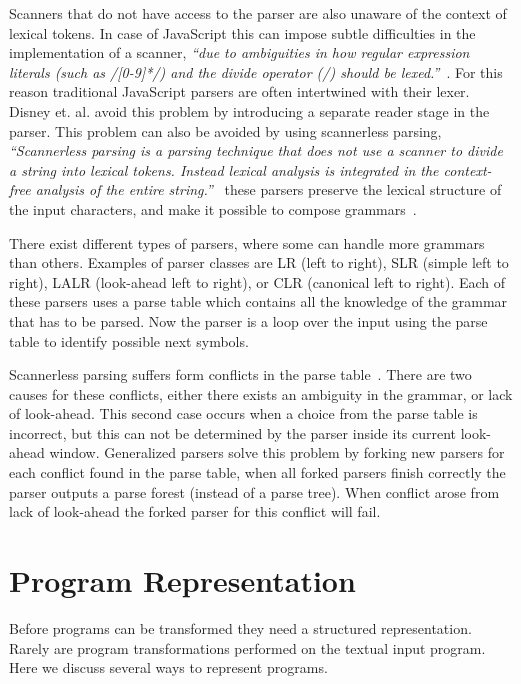 Scanners that do not have access to the parser are also unaware of the context of lexical tokens. In case of JavaScript this can impose subtle difficulties in the implementation of a scanner, \textit{``due to ambiguities in how regular expression literals (such as /[0-9]*/) and the divide operator (/) should be lexed.''}~\cite{Disney2014}. For this reason traditional JavaScript parsers are often intertwined with their lexer. Disney et. al. avoid this problem by introducing a separate reader stage in the parser. This problem can also be avoided by using scannerless parsing, \textit{``Scannerless parsing is a parsing technique that does not use a scanner to divide a string into lexical tokens. Instead lexical analysis is integrated in the context-free analysis of the entire string.''}~\cite{Visser1997} these parsers preserve the lexical structure of the input characters, and make it possible to compose grammars~\cite{Visser1997}.

There exist different types of parsers, where some can handle more grammars than others. Examples of parser classes are LR (left to right), SLR (simple left to right), LALR (look-ahead left to right), or CLR (canonical left to right). Each of these parsers uses a parse table which contains all the knowledge of the grammar that has to be parsed. Now the parser is a loop over the input using the parse table to identify possible next symbols.

Scannerless parsing suffers form conflicts in the parse table~\cite{Visser1997}. There are two causes for these conflicts, either there exists an ambiguity in the grammar, or lack of look-ahead. This second case occurs when a choice from the parse table is incorrect, but this can not be determined by the parser inside its current look-ahead window. Generalized parsers solve this problem by forking new parsers for each conflict found in the parse table, when all forked parsers finish correctly the parser outputs a parse forest (instead of a parse tree). When conflict arose from lack of look-ahead the forked parser for this conflict will fail.

\section{Program Representation} \label{program-representation}
Before programs can be transformed they need a structured representation. Rarely are program transformations performed on the textual input program. Here we discuss several ways to represent programs.

